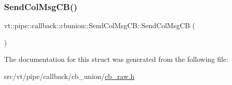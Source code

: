 \subsubsection{\texorpdfstring{Send\+Col\+Msg\+C\+B()}{SendColMsgCB()}}
{\footnotesize\ttfamily vt\+::pipe\+::callback\+::cbunion\+::\+Send\+Col\+Msg\+C\+B\+::\+Send\+Col\+Msg\+CB (\begin{DoxyParamCaption}{ }\end{DoxyParamCaption})\hspace{0.3cm}{\ttfamily [default]}}



The documentation for this struct was generated from the following file\+:\begin{DoxyCompactItemize}
\item 
src/vt/pipe/callback/cb\+\_\+union/\hyperlink{cb__raw_8h}{cb\+\_\+raw.\+h}\end{DoxyCompactItemize}
